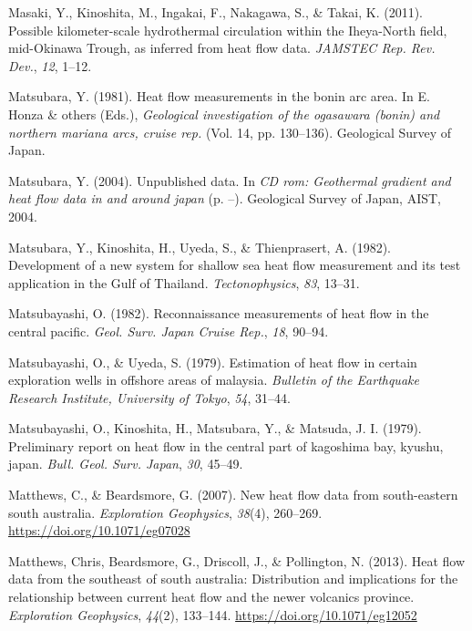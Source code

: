 \documentclass[draft,linenumbers]{agujournal2018}
\begin{document}
\leavevmode{}%
Masaki, Y., Kinoshita, M., Ingakai, F., Nakagawa, S., \& Takai, K.
(2011). Possible kilometer-scale hydrothermal circulation within the
{Iheya-North} field, {mid-Okinawa Trough}, as inferred from heat flow
data. \emph{JAMSTEC Rep. Rev. Dev.}, \emph{12}, 1--12.

\leavevmode{}%
Matsubara, Y. (1981). Heat flow measurements in the bonin arc area. In
E. Honza \& others (Eds.), \emph{Geological investigation of the
ogasawara (bonin) and northern mariana arcs, cruise rep.} (Vol. 14, pp.
130--136). Geological Survey of Japan.

\leavevmode{}%
Matsubara, Y. (2004). Unpublished data. In \emph{CD rom: Geothermal
gradient and heat flow data in and around japan} (p. --). Geological
Survey of Japan, AIST, 2004.

\leavevmode{}%
Matsubara, Y., Kinoshita, H., Uyeda, S., \& Thienprasert, A. (1982).
Development of a new system for shallow sea heat flow measurement and
its test application in the {Gulf of Thailand}. \emph{Tectonophysics},
\emph{83}, 13--31.

\leavevmode{}%
Matsubayashi, O. (1982). Reconnaissance measurements of heat flow in the
central pacific. \emph{Geol. Surv. Japan Cruise Rep.}, \emph{18},
90--94.

\leavevmode{}%
Matsubayashi, O., \& Uyeda, S. (1979). Estimation of heat flow in
certain exploration wells in offshore areas of malaysia. \emph{Bulletin
of the Earthquake Research Institute, University of Tokyo}, \emph{54},
31--44.

\leavevmode{}%
Matsubayashi, O., Kinoshita, H., Matsubara, Y., \& Matsuda, J. I.
(1979). Preliminary report on heat flow in the central part of kagoshima
bay, kyushu, japan. \emph{Bull. Geol. Surv. Japan}, \emph{30}, 45--49.

\leavevmode{}%
Matthews, C., \& Beardsmore, G. (2007). New heat flow data from
south-eastern south australia. \emph{Exploration Geophysics},
\emph{38}(4), 260--269. \url{https://doi.org/10.1071/eg07028}

\leavevmode{}%
Matthews, Chris, Beardsmore, G., Driscoll, J., \& Pollington, N. (2013).
Heat flow data from the southeast of south australia: Distribution and
implications for the relationship between current heat flow and the
newer volcanics province. \emph{Exploration Geophysics}, \emph{44}(2),
133--144. \url{https://doi.org/10.1071/eg12052}
\end{document}
